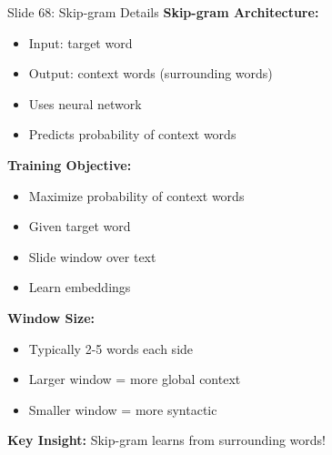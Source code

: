 \documentclass[8pt]{beamer}
\begin{document}
	\begin{frame}{Slide 68: Skip-gram Details}
		\fontsize{6.5}{7.5}\selectfont
		\textbf{Skip-gram Architecture:}
		\begin{itemize}
			\item Input: target word
			\item Output: context words (surrounding words)
			\item Uses neural network
			\item Predicts probability of context words
		\end{itemize}
		
		\vspace{0.1cm}
		\textbf{Training Objective:}
		\begin{itemize}
			\item Maximize probability of context words
			\item Given target word
			\item Slide window over text
			\item Learn embeddings
		\end{itemize}
		
		\vspace{0.1cm}
		\textbf{Window Size:}
		\begin{itemize}
			\item Typically 2-5 words each side
			\item Larger window = more global context
			\item Smaller window = more syntactic
		\end{itemize}
		
		\textcolor{myblue}{\textbf{Key Insight:}} Skip-gram learns from surrounding words!
	\end{frame}
	
\end{document}
